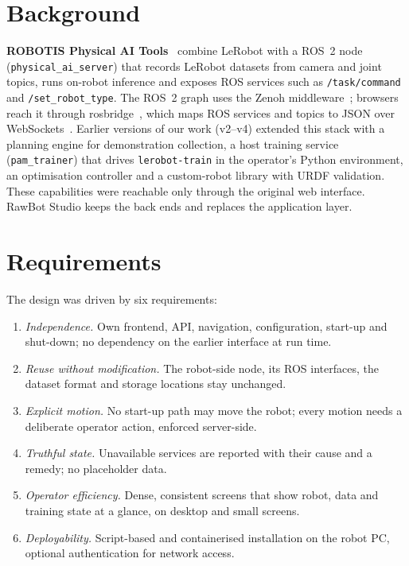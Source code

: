 \documentclass[conference]{IEEEtran}
\begin{document}
\section{Background}
\textbf{ROBOTIS Physical AI Tools}~\cite{pat} combine LeRobot with a ROS~2 node
(\texttt{physical\_ai\_server}) that records LeRobot datasets from camera and joint topics, runs
on-robot inference and exposes ROS services such as \texttt{/task/command} and
\texttt{/set\_robot\_type}. The ROS~2 graph uses the Zenoh middleware~\cite{zenoh}; browsers
reach it through rosbridge~\cite{rosbridge}, which maps ROS services and topics to JSON over
WebSockets~\cite{rfc6455}. Earlier versions of our work (v2--v4) extended this stack with a
planning engine for demonstration collection, a host training service (\texttt{pam\_trainer})
that drives \texttt{lerobot-train} in the operator's Python environment, an optimisation
controller and a custom-robot library with URDF validation. These capabilities were reachable
only through the original web interface. RawBot Studio keeps the back ends and replaces the
application layer.

\section{Requirements}
The design was driven by six requirements:
\begin{enumerate}
\item[R1] \emph{Independence.} Own frontend, API, navigation, configuration, start-up and
shut-down; no dependency on the earlier interface at run time.
\item[R2] \emph{Reuse without modification.} The robot-side node, its ROS interfaces, the dataset
format and storage locations stay unchanged.
\item[R3] \emph{Explicit motion.} No start-up path may move the robot; every motion needs a
deliberate operator action, enforced server-side.
\item[R4] \emph{Truthful state.} Unavailable services are reported with their cause and a
remedy; no placeholder data.
\item[R5] \emph{Operator efficiency.} Dense, consistent screens that show robot, data and
training state at a glance, on desktop and small screens.
\item[R6] \emph{Deployability.} Script-based and containerised installation on the robot PC,
optional authentication for network access.
\end{enumerate}
\end{document}
